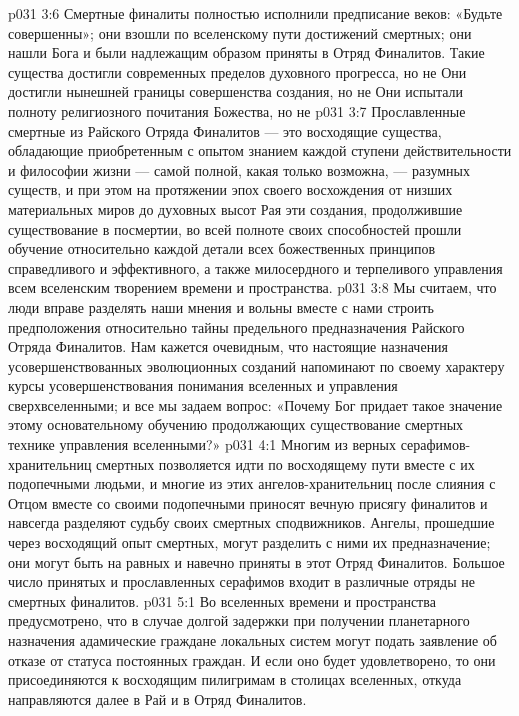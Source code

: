 \vs p031 3:6 \bibnobreakspace Смертные финалиты полностью исполнили предписание веков: «Будьте совершенны»; они взошли по вселенскому пути достижений смертных; они нашли Бога и были надлежащим образом приняты в Отряд Финалитов. Такие существа достигли современных пределов духовного прогресса, но не  Они достигли нынешней границы совершенства создания, но не  Они испытали полноту религиозного почитания Божества, но не 
\vs p031 3:7 \bibnobreakspace Прославленные смертные из Райского Отряда Финалитов --- это восходящие существа, обладающие приобретенным с опытом знанием каждой ступени действительности и философии жизни --- самой полной, какая только возможна, --- разумных существ, и при этом на протяжении эпох своего восхождения от низших материальных миров до духовных высот Рая эти создания, продолжившие существование в посмертии, во всей полноте своих способностей прошли обучение относительно каждой детали всех божественных принципов справедливого и эффективного, а также милосердного и терпеливого управления всем вселенским творением времени и пространства.
\vs p031 3:8 \pc Мы считаем, что люди вправе разделять наши мнения и вольны вместе с нами строить предположения относительно тайны предельного предназначения Райского Отряда Финалитов. Нам кажется очевидным, что настоящие назначения усовершенствованных эволюционных созданий напоминают по своему характеру курсы усовершенствования понимания вселенных и управления сверхвселенными; и все мы задаем вопрос: «Почему Бог придает такое значение этому основательному обучению продолжающих существование смертных технике управления вселенными?»
\vs p031 4:1 Многим из верных серафимов\hyp{}хранительниц смертных позволяется идти по восходящему пути вместе с их подопечными людьми, и многие из этих ангелов\hyp{}хранительниц после слияния с Отцом вместе со своими подопечными приносят вечную присягу финалитов и навсегда разделяют судьбу своих смертных сподвижников. Ангелы, прошедшие через восходящий опыт смертных, могут разделить с ними их предназначение; они могут быть на равных и навечно приняты в этот Отряд Финалитов. Большое число принятых и прославленных серафимов входит в различные отряды не смертных финалитов.
\vs p031 5:1 Во вселенных времени и пространства предусмотрено, что в случае долгой задержки при получении планетарного назначения адамические граждане локальных систем могут подать заявление об отказе от статуса постоянных граждан. И если оно будет удовлетворено, то они присоединяются к восходящим пилигримам в столицах вселенных, откуда направляются далее в Рай и в Отряд Финалитов.
